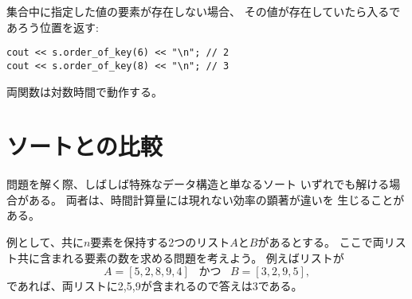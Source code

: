 集合中に指定した値の要素が存在しない場合、
その値が存在していたら入るであろう位置を返す:
\begin{lstlisting}
cout << s.order_of_key(6) << "\n"; // 2
cout << s.order_of_key(8) << "\n"; // 3
\end{lstlisting}

\begin{comment}
Both the functions work in logarithmic time.
\end{comment}

両関数は対数時間で動作する。

\begin{comment}
\section{Comparison to sorting}

It is often possible to solve a problem
using either data structures or sorting.
Sometimes there are remarkable differences
in the actual efficiency of these approaches,
which may be hidden in their time complexities.
\end{comment}

\section{ソートとの比較}

問題を解く際、しばしば特殊なデータ構造と単なるソート
いずれでも解ける場合がある。
両者は、時間計算量には現れない効率の顕著が違いを
生じることがある。


\begin{comment}
Let us consider a problem where
we are given two lists $A$ and $B$
that both contain $n$ elements.
Our task is to calculate the number of elements
that belong to both of the lists.
For example, for the lists
\[A = [5,2,8,9,4] \hspace{10pt} \textrm{and} \hspace{10pt} B = [3,2,9,5],\]
the answer is 3 because the numbers 2, 5
and 9 belong to both of the lists.
\end{comment}

例として、共に$n$要素を保持する2つのリスト$A$と$B$があるとする。
ここで両リスト共に含まれる要素の数を求める問題を考えよう。
例えばリストが
\[A = [5,2,8,9,4] \hspace{10pt} \textrm{かつ} \hspace{10pt} B = [3,2,9,5],\]
であれば、両リストに2,5,9が含まれるので答えは3である。

\begin{comment}
A straightforward solution to the problem is
to go through all pairs of elements in $O(n^2)$ time,
but next we will focus on
more efficient algorithms.
\end{comment}

